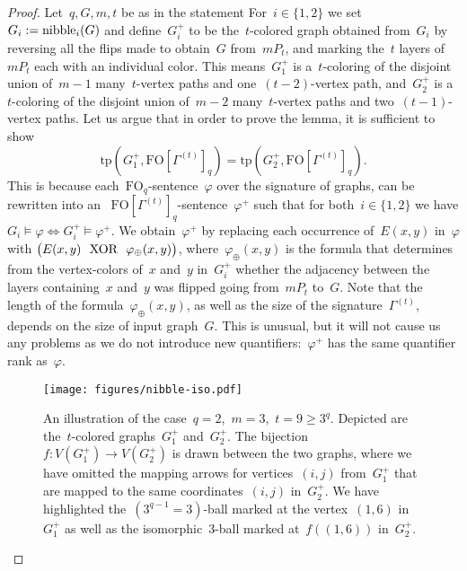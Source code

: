 \documentclass[11pt]{article}      \usepackage[margin=1in]{geometry}  \usepackage{microtype}
\theoremstyle{definition}
\newcommand{\tp}{\mathrm{tp}}
\renewcommand{\phi}{\varphi}
\newcommand{\XOR}{\textnormal{~~XOR~~}}
\newcommand{\FO}{\mathrm{FO}}
\renewcommand{\ge}{\geqslant}
\renewcommand{\geq}{\ge}
\begin{document}
\begin{proof}
    Let~$q,G,m,t$ be as in the statement
    For~$i\in \{1,2\}$ we set~$G_i := \mathrm{nibble}_i(G)$ and define~$G^+_i$ to be the~$t$-colored graph obtained from~$G_i$ by reversing all the flips made to obtain~$G$ from~$mP_t$, and marking the~$t$ layers of~$mP_t$ each with an individual color.
    This means~$G_1^+$ is a~$t$-coloring of the disjoint union of~$m - 1$ many~$t$-vertex paths and one~$(t-2)$-vertex path, and~$G_2^+$ is a~$t$-coloring of the disjoint union of~$m - 2$ many~$t$-vertex paths and two~$(t-1)$-vertex paths.
    Let us argue that in order to prove the lemma, it is sufficient to show 
    \begin{equation}\label{eq:nibble-equiv}
        \tag{$*$}
        \tp(G_1^+,\FO[\Gamma^{(t)}]_q) = \tp(G_2^+,\FO[\Gamma^{(t)}]_q).    
    \end{equation}
    This is because each~$\FO_q$-sentence~$\phi$ over the signature of graphs, can be rewritten into an
   ~$\FO[\Gamma^{(t)}]_q$-sentence~$\phi^+$ such that for both~$i\in\{1,2\}$ we have
        $G_i \models \phi \Leftrightarrow G_i^+ \models \phi^+$.
    We obtain~$\phi^+$ by replacing each occurrence of~$E(x,y)$ in~$\phi$ with 
    $\big(E(x,y) \XOR \phi_\oplus(x,y)\big)$,
    where~$\phi_\oplus(x,y)$ is the formula that determines from the vertex-colors of~$x$ and~$y$ in~$G^+_i$ whether the adjacency between the layers containing~$x$ and~$y$ was flipped going from~$mP_t$ to~$G$.
    Note that the length of the formula~$\phi_\oplus(x,y)$, as well as the size of the signature~$\Gamma^{(t)}$, depends on the size of input graph~$G$. This is unusual, but it will not cause us any problems as we do not introduce new quantifiers:~$\phi^+$ has the same quantifier rank as~$\phi$.


    \begin{figure}[h!]
        \centering
        \texttt{[image: figures/nibble-iso.pdf]}
        \caption{An illustration of the case~$q = 2$,~$m = 3$,~$t = 9 \geq 3^q$.
        Depicted are the~$t$-colored graphs~$G^+_1$ and~$G^+_2$. The bijection~$f : V(G^+_1) \to  V(G^+_2)$ is drawn between the two graphs, where we have omitted the mapping arrows for vertices~$(i,j)$ from~$G^+_1$ that are mapped to the same coordinates~$(i,j)$ in~$G^+_2$.
        We have highlighted the~$(3^{q-1} = 3)$-ball marked at the vertex~$(1,6)$ in~$G_1^+$ as well as the isomorphic~$3$-ball marked at~$f((1,6))$ in~$G^+_2$.
        }
        \label{fig:nibble-iso}
    \end{figure}


\end{proof}
\end{document}
